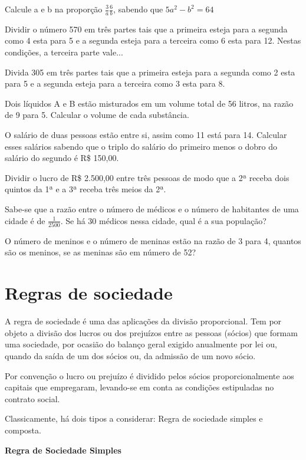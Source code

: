 \begin{exercicios}
	\exitem{} Calcule a e b na proporção $\frac{3}{a}\frac{6}{b}$, sabendo que $5a^2-b^2=64$

	\exitem{} Dividir o número 570 em três partes tais que a primeira esteja para a segunda como 4 esta para 5 e a segunda esteja para a terceira como 6 esta para 12. Nestas condições, a terceira parte vale...

	\exitem{} Divida 305 em três partes tais que a primeira esteja para a segunda como 2 esta para 5 e a segunda esteja para a terceira como 3 esta para 8. 

	\exitem{}  Dois líquidos A e B estão misturados em um volume total de 56 litros, na razão de 9 para 5. Calcular o volume de cada substância. 

	\exitem{} O salário de duas pessoas estão entre si, assim como 11 está para 14. Calcular esses salários sabendo que o triplo do salário do primeiro menos o dobro do salário do segundo é R\$  150,00. 

	\exitem{}  Dividir o lucro de R\$ 2.500,00 entre três pessoas de modo que a 2ª receba dois quintos da 1ª e a 3ª receba três meios da 2ª.

	\exitem{}  Sabe-se que a razão entre o número de médicos e o número de habitantes de uma cidade é de $\frac{1}{2500}$. Se há 30 médicos nessa cidade, qual é a sua população?

	\exitem O número de meninos e o número de meninas estão na razão de 3 para 4, quantos são os meninos, se as meninas são em número de 52?

\end{exercicios}

\section{Regras de sociedade }

\quad A regra de sociedade é uma das aplicações da divisão proporcional. Tem por objeto a divisão dos lucros ou dos prejuízos entre as pessoas (sócios) que formam uma sociedade, por ocasião do balanço geral exigido anualmente por lei ou, quando da saída de um dos sócios ou, da admissão de um novo sócio. 


\quad Por convenção o lucro ou prejuízo é dividido pelos sócios proporcionalmente aos capitais que empregaram, levando-se em conta as condições estipuladas no contrato social.

\quad Classicamente, há dois tipos a considerar: Regra de sociedade simples e composta.

\quad \textbf{Regra de Sociedade Simples }

